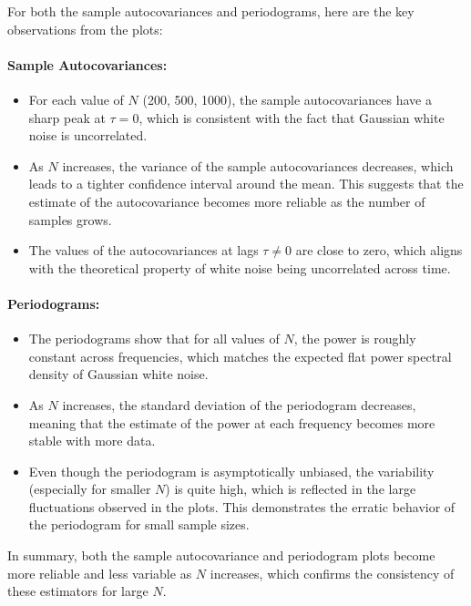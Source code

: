 \documentclass[11pt]{article}
\begin{document}

\begin{solution} %

    For both the sample autocovariances and periodograms, here are the key observations from the plots:
    
    \paragraph{Sample Autocovariances:}
    \begin{itemize}    
        \item For each value of $N$ (200, 500, 1000), the sample autocovariances have a sharp peak at $\tau = 0$, which is consistent with the fact that Gaussian white noise is uncorrelated. 
        \item As $N$ increases, the variance of the sample autocovariances decreases, which leads to a tighter confidence interval around the mean. This suggests that the estimate of the autocovariance becomes more reliable as the number of samples grows.
        \item The values of the autocovariances at lags $\tau \neq 0$ are close to zero, which aligns with the theoretical property of white noise being uncorrelated across time.
    \end{itemize}

    \paragraph{Periodograms:}
    \begin{itemize} 
        \item The periodograms show that for all values of $N$, the power is roughly constant across frequencies, which matches the expected flat power spectral density of Gaussian white noise.
        \item As $N$ increases, the standard deviation of the periodogram decreases, meaning that the estimate of the power at each frequency becomes more stable with more data.
        \item Even though the periodogram is asymptotically unbiased, the variability (especially for smaller $N$) is quite high, which is reflected in the large fluctuations observed in the plots. This demonstrates the erratic behavior of the periodogram for small sample sizes.
    \end{itemize}

    In summary, both the sample autocovariance and periodogram plots become more reliable and less variable as $N$ increases, which confirms the consistency of these estimators for large $N$.
    
\end{solution} %
    
\end{document}
